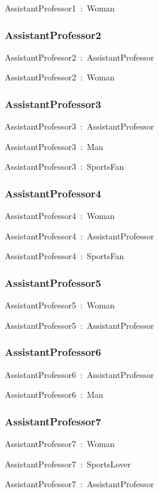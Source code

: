 \documentclass{article}
\begin{document}
AssistantProfessor1~:~Woman

\subsubsection*{AssistantProfessor2}

AssistantProfessor2~:~AssistantProfessor

AssistantProfessor2~:~Woman

\subsubsection*{AssistantProfessor3}

AssistantProfessor3~:~AssistantProfessor

AssistantProfessor3~:~Man

AssistantProfessor3~:~SportsFan

\subsubsection*{AssistantProfessor4}

AssistantProfessor4~:~Woman

AssistantProfessor4~:~AssistantProfessor

AssistantProfessor4~:~SportsFan

\subsubsection*{AssistantProfessor5}

AssistantProfessor5~:~Woman

AssistantProfessor5~:~AssistantProfessor

\subsubsection*{AssistantProfessor6}

AssistantProfessor6~:~AssistantProfessor

AssistantProfessor6~:~Man

\subsubsection*{AssistantProfessor7}

AssistantProfessor7~:~Woman

AssistantProfessor7~:~SportsLover

AssistantProfessor7~:~AssistantProfessor
\end{document}
